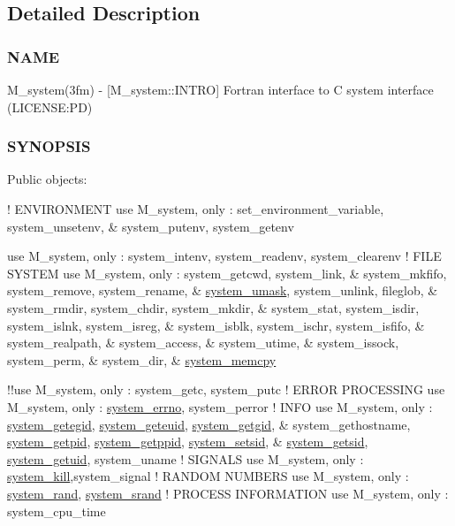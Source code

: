\subsection{Detailed Description}
\subsubsection*{N\+A\+ME}

M\+\_\+system(3fm) -\/ \mbox{[}M\+\_\+system\+::\+I\+N\+T\+RO\mbox{]} Fortran interface to C system interface (L\+I\+C\+E\+N\+SE\+:PD) \subsubsection*{S\+Y\+N\+O\+P\+S\+IS}

Public objects\+:

! E\+N\+V\+I\+R\+O\+N\+M\+E\+NT use M\+\_\+system, only \+: set\+\_\+environment\+\_\+variable, system\+\_\+unsetenv, \& system\+\_\+putenv, system\+\_\+getenv

use M\+\_\+system, only \+: system\+\_\+intenv, system\+\_\+readenv, system\+\_\+clearenv ! F\+I\+LE S\+Y\+S\+T\+EM use M\+\_\+system, only \+: system\+\_\+getcwd, system\+\_\+link, \& system\+\_\+mkfifo, system\+\_\+remove, system\+\_\+rename, \& \mbox{\hyperlink{interfacem__system_1_1system__umask}{system\+\_\+umask}}, system\+\_\+unlink, fileglob, \& system\+\_\+rmdir, system\+\_\+chdir, system\+\_\+mkdir, \& system\+\_\+stat, system\+\_\+isdir, system\+\_\+islnk, system\+\_\+isreg, \& system\+\_\+isblk, system\+\_\+ischr, system\+\_\+isfifo, \& system\+\_\+realpath, \& system\+\_\+access, \& system\+\_\+utime, \& system\+\_\+issock, system\+\_\+perm, \& system\+\_\+dir, \& \mbox{\hyperlink{interfacem__system_1_1system__memcpy}{system\+\_\+memcpy}}

!!use M\+\_\+system, only \+: system\+\_\+getc, system\+\_\+putc ! E\+R\+R\+OR P\+R\+O\+C\+E\+S\+S\+I\+NG use M\+\_\+system, only \+: \mbox{\hyperlink{interfacem__system_1_1system__errno}{system\+\_\+errno}}, system\+\_\+perror ! I\+N\+FO use M\+\_\+system, only \+: \mbox{\hyperlink{interfacem__system_1_1system__getegid}{system\+\_\+getegid}}, \mbox{\hyperlink{interfacem__system_1_1system__geteuid}{system\+\_\+geteuid}}, \mbox{\hyperlink{interfacem__system_1_1system__getgid}{system\+\_\+getgid}}, \& system\+\_\+gethostname, \mbox{\hyperlink{interfacem__system_1_1system__getpid}{system\+\_\+getpid}}, \mbox{\hyperlink{interfacem__system_1_1system__getppid}{system\+\_\+getppid}}, \mbox{\hyperlink{interfacem__system_1_1system__setsid}{system\+\_\+setsid}}, \& \mbox{\hyperlink{interfacem__system_1_1system__getsid}{system\+\_\+getsid}}, \mbox{\hyperlink{interfacem__system_1_1system__getuid}{system\+\_\+getuid}}, system\+\_\+uname ! S\+I\+G\+N\+A\+LS use M\+\_\+system, only \+: \mbox{\hyperlink{interfacem__system_1_1system__kill}{system\+\_\+kill}},system\+\_\+signal ! R\+A\+N\+D\+OM N\+U\+M\+B\+E\+RS use M\+\_\+system, only \+: \mbox{\hyperlink{interfacem__system_1_1system__rand}{system\+\_\+rand}}, \mbox{\hyperlink{interfacem__system_1_1system__srand}{system\+\_\+srand}} ! P\+R\+O\+C\+E\+SS I\+N\+F\+O\+R\+M\+A\+T\+I\+ON use M\+\_\+system, only \+: system\+\_\+cpu\+\_\+time

